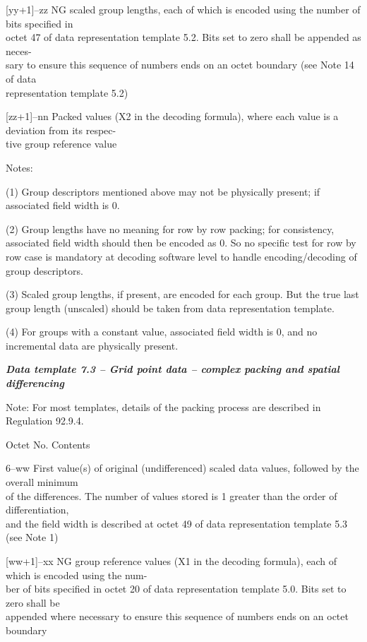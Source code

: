 {[}yy+1{]}--zz NG scaled group lengths, each of which is encoded using the number of bits specified in\\
octet 47 of data representation template 5.2. Bits set to zero shall be appended as neces-\\
sary to ensure this sequence of numbers ends on an octet boundary (see Note 14 of data\\
representation template 5.2)

{[}zz+1{]}--nn Packed values (X2 in the decoding formula), where each value is a deviation from its respec-\\
tive group reference value

Notes:

(1) Group descriptors mentioned above may not be physically present; if associated field width is 0.

(2) Group lengths have no meaning for row by row packing; for consistency, associated field width should then be encoded as 0. So no specific test for row by row case is mandatory at decoding software level to handle encoding/decoding of group descriptors.

(3) Scaled group lengths, if present, are encoded for each group. But the true last group length (unscaled) should be taken from data representation template.

(4) For groups with a constant value, associated field width is 0, and no incremental data are physically present.

\emph{\textbf{Data template 7.3 -- Grid point data -- complex packing and spatial differencing}}

Note: For most templates, details of the packing process are described in Regulation 92.9.4.

Octet No. Contents

6--ww First value(s) of original (undifferenced) scaled data values, followed by the overall minimum\\
of the differences. The number of values stored is 1 greater than the order of differentiation,\\
and the field width is described at octet 49 of data representation template 5.3 (see Note 1)

{[}ww+1{]}--xx NG group reference values (X1 in the decoding formula), each of which is encoded using the num-\\
ber of bits specified in octet 20 of data representation template 5.0. Bits set to zero shall be\\
appended where necessary to ensure this sequence of numbers ends on an octet boundary

